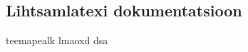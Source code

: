\documentclass{article}
\begin{document}
\begin{center}\section*{Lihtsamlatexi dokumentatsioon
}\end{center}teemapealk lmaoxd 
dsa
\end{document}
